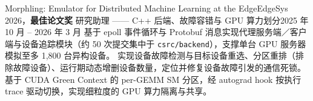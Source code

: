     \resumeSubheading
      {Morphling: Emulator for Distributed Machine Learning at the Edge}{EdgeSys 2026，\textbf{最佳论文奖}}
      {研究助理 —— C++ 后端、故障容错与 GPU 算力划分}{2025 年 10 月 -- 2026 年 3 月}
      \resumeItemListStart
          {基于 epoll 事件循环与 Protobuf 消息实现代理服务端／客户端与设备追踪模块（约 50 次提交集中于 \texttt{csrc/backend}），支撑单台 GPU 服务器模拟至多 1{,}800 台异构设备。}
          {实现设备故障检测与目标设备重选、分区重排（排除故障设备）、运行期动态增删设备数量，定位并修复设备故障引发的通信死锁。}
          {基于 CUDA Green Context 的 per-GEMM SM 分区，经 autograd hook 按执行 trace 驱动切换，实现细粒度的 GPU 算力隔离与共享。}
      \resumeItemListEnd
